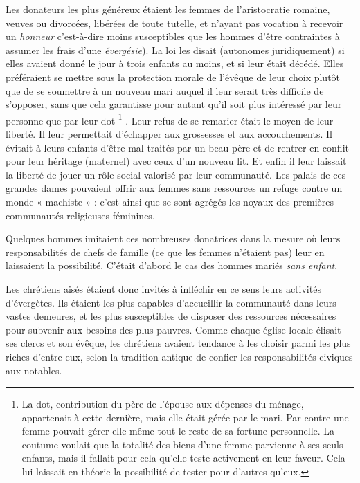  Les donateurs les plus généreux étaient les femmes de l'aristocratie romaine, veuves ou divorcées, libérées de toute tutelle, et n'ayant pas vocation à recevoir un \emph{honneur} c'est-à-dire moins susceptibles que les hommes d'être contraintes à assumer les frais d'une \emph{évergésie}). La loi les disait  (autonomes juridiquement) si elles avaient donné le jour à trois enfants au moins, et si leur  était décédé. Elles préféraient se mettre sous la protection morale de l'évêque de leur choix plutôt que de se soumettre à un nouveau mari auquel il leur serait très difficile de s'opposer, sans que cela garantisse pour autant qu'il soit plus intéressé par leur personne que par leur dot%
\footnote{La dot, contribution du père de l'épouse aux dépenses du ménage, appartenait à cette dernière, mais elle était gérée par le mari. Par contre une femme  pouvait gérer elle-même tout le reste de sa fortune personnelle. La coutume voulait que la totalité des biens d'une femme parvienne à ses seuls enfants, mais il fallait pour cela qu'elle teste activement en leur faveur. Cela lui laissait en théorie la possibilité de tester pour d'autres qu'eux.}%
. Leur refus de se remarier était le moyen de leur liberté. Il leur permettait d'échapper aux grossesses et aux accouchements. Il évitait à leurs enfants d'être mal traités par un beau-père et de rentrer en conflit pour leur héritage (maternel) avec ceux d'un nouveau lit. Et enfin il leur laissait la liberté de jouer un rôle social valorisé par leur communauté. Les palais de ces grandes dames pouvaient offrir aux femmes sans ressources un refuge contre un monde « machiste » : c'est ainsi que se sont agrégés les noyaux des premières communautés religieuses féminines. 

 Quelques hommes imitaient ces nombreuses donatrices dans la mesure où leurs responsabilités de chefs de famille (ce que les femmes n'étaient pas) leur en laissaient la possibilité. C'était d'abord le cas des hommes mariés \emph{sans enfant}.

 Les chrétiens aisés étaient donc invités à infléchir en ce sens leurs activités d'évergètes. Ils étaient les plus capables d'accueillir la communauté dans leurs vastes demeures, et les plus susceptibles de disposer des ressources nécessaires pour subvenir aux besoins des plus pauvres. Comme chaque église locale élisait ses clercs et son évêque, les chrétiens avaient tendance à les choisir parmi les plus riches d'entre eux, selon la tradition antique de confier les responsabilités civiques aux notables. 

